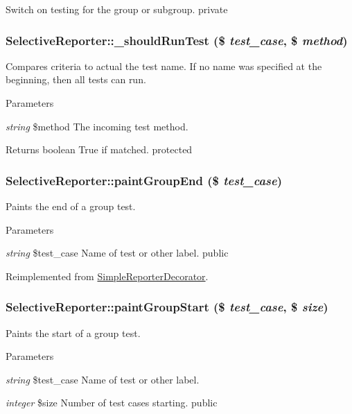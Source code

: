 \label{class_selective_reporter_aa09eb9deff7a2fcd6f35cb441b4458cb}
Switch on testing for the group or subgroup.  private \hypertarget{class_selective_reporter_aec4a64bdd3c2531229d6c0f34aa78f03}{
\subsubsection[{\_\-shouldRunTest}]{\setlength{\rightskip}{0pt plus 5cm}SelectiveReporter::\_\-shouldRunTest (\$ {\em test\_\-case}, \/  \$ {\em method})}}
\label{class_selective_reporter_aec4a64bdd3c2531229d6c0f34aa78f03}
Compares criteria to actual the test name. If no name was specified at the beginning, then all tests can run. 
\begin{DoxyParams}{Parameters}
\item[{\em string}]\$method The incoming test method. \end{DoxyParams}
\begin{DoxyReturn}{Returns}
boolean True if matched.  protected 
\end{DoxyReturn}
\hypertarget{class_selective_reporter_a3d49dee3f9831508049c46b3f8bc48e1}{
\subsubsection[{paintGroupEnd}]{\setlength{\rightskip}{0pt plus 5cm}SelectiveReporter::paintGroupEnd (\$ {\em test\_\-case})}}
\label{class_selective_reporter_a3d49dee3f9831508049c46b3f8bc48e1}
Paints the end of a group test. 
\begin{DoxyParams}{Parameters}
\item[{\em string}]\$test\_\-case Name of test or other label.  public \end{DoxyParams}


Reimplemented from \hyperlink{class_simple_reporter_decorator_a836e0cd11187140b1646bcd1fee494d1}{SimpleReporterDecorator}.\hypertarget{class_selective_reporter_af83e76607ce4fed137722eadc77549ff}{
\subsubsection[{paintGroupStart}]{\setlength{\rightskip}{0pt plus 5cm}SelectiveReporter::paintGroupStart (\$ {\em test\_\-case}, \/  \$ {\em size})}}
\label{class_selective_reporter_af83e76607ce4fed137722eadc77549ff}
Paints the start of a group test. 
\begin{DoxyParams}{Parameters}
\item[{\em string}]\$test\_\-case Name of test or other label. \item[{\em integer}]\$size Number of test cases starting.  public \end{DoxyParams}


